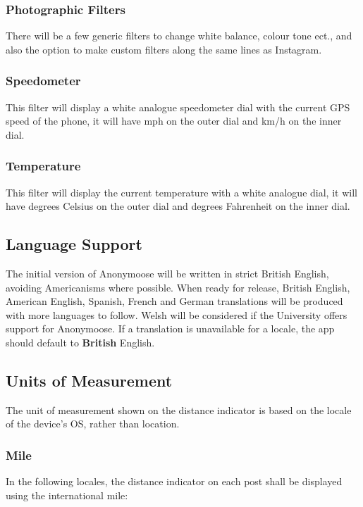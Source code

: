 \documentclass[12pt, a4paper]{article}
\begin{document}
\subsubsection{Photographic Filters}
There will be a few generic filters to change white balance, colour tone ect., and also the option to make custom filters along the same lines as Instagram.
\subsubsection{Speedometer}
This filter will display a white analogue speedometer dial with the current GPS speed of the phone, it will have mph on the outer dial and km/h on the inner dial.
\subsubsection{Temperature}
This filter will display the current temperature with a white analogue dial, it will have degrees Celsius on the outer dial and degrees Fahrenheit on the inner dial.
\subsection{Language Support}
The initial version of Anonymoose will be written in strict British English, avoiding Americanisms where possible. When ready for release, British English, American English, Spanish, French and German translations will be produced with more languages to follow. Welsh will be considered if the University offers support for Anonymoose. If a translation is unavailable for a locale, the app should default to \textbf{British} English.
\clearpage 
\subsection{Units of Measurement}
The unit of measurement shown on the distance indicator is based on the locale of the device's OS, rather than location.
\subsubsection{Mile}
In the following locales, the distance indicator on each post shall be displayed using the international mile:
\end{document}
